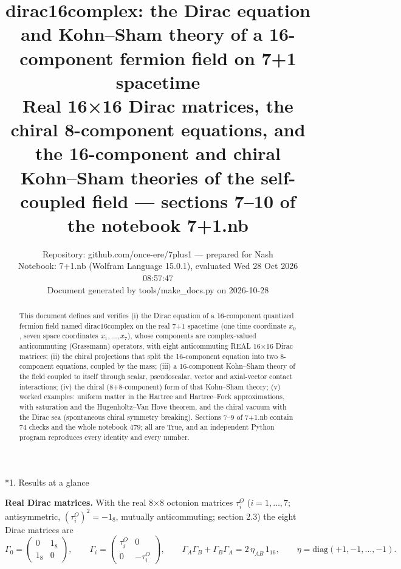 \documentclass[10pt,a4paper]{article}
\makeatletter
\renewcommand\section{\@startsection{section}{1}{\z@}{-3.5ex \@plus -1ex \@minus -.2ex}{2.3ex \@plus.2ex}{\normalfont\Large\bfseries\raggedright}}
\makeatother
\begin{document}
\title{dirac16complex: the Dirac equation and Kohn–Sham theory of a 16-component fermion field on 7+1 spacetime\\[0.4em]\large Real 16×16 Dirac matrices, the chiral 8-component equations, and the 16-component and chiral Kohn–Sham theories of the self-coupled field — sections 7–10 of the notebook 7+1.nb}
\author{Repository: github.com/once-ere/7plus1 — prepared for Nash\\ Notebook: 7+1.nb (Wolfram Language 15.0.1), evaluated Wed 28 Oct 2026 08:57:47\\ Document generated by tools/make\_docs.py on 2026-10-28}
\date{}
\maketitle
\begin{abstract}
This document defines and verifies (i) the Dirac equation of a 16-component quantized fermion field named dirac16complex on the real 7+1 spacetime (one time coordinate $x_0$, seven space coordinates $x_1,\dots,x_7$), whose components are complex-valued anticommuting (Grassmann) operators, with eight anticommuting REAL 16×16 Dirac matrices; (ii) the chiral projections that split the 16-component equation into two 8-component equations, coupled by the mass; (iii) a 16-component Kohn–Sham theory of the field coupled to itself through scalar, pseudoscalar, vector and axial-vector contact interactions; (iv) the chiral (8+8-component) form of that Kohn–Sham theory; (v) worked examples: uniform matter in the Hartree and Hartree–Fock approximations, with saturation and the Hugenholtz–Van Hove theorem, and the chiral vacuum with the Dirac sea (spontaneous chiral symmetry breaking). Sections 7–9 of 7+1.nb contain 74 checks and the whole notebook 479; all are True, and an independent Python program reproduces every identity and every number.
\end{abstract}
\tableofcontents
{}\section*{1. Results at a glance}
\textbf{Real Dirac matrices.} With the real 8×8 octonion matrices $\tau^{O}_i$ ($i=1,\dots,7$; antisymmetric, $(\tau^{O}_i)^2=-1_8$, mutually anticommuting; section 2.3) the eight Dirac matrices are
\begin{equation*}
\Gamma_0=\begin{pmatrix}0&1_8\\1_8&0\end{pmatrix},\qquad \Gamma_i=\begin{pmatrix}\tau^{O}_i&0\\0&-\tau^{O}_i\end{pmatrix},\qquad \Gamma_A\Gamma_B+\Gamma_B\Gamma_A=2\,\eta_{AB}\,1_{16},\qquad \eta=\mathrm{diag}(+1,-1,\dots,-1).
\end{equation*}
\end{document}

